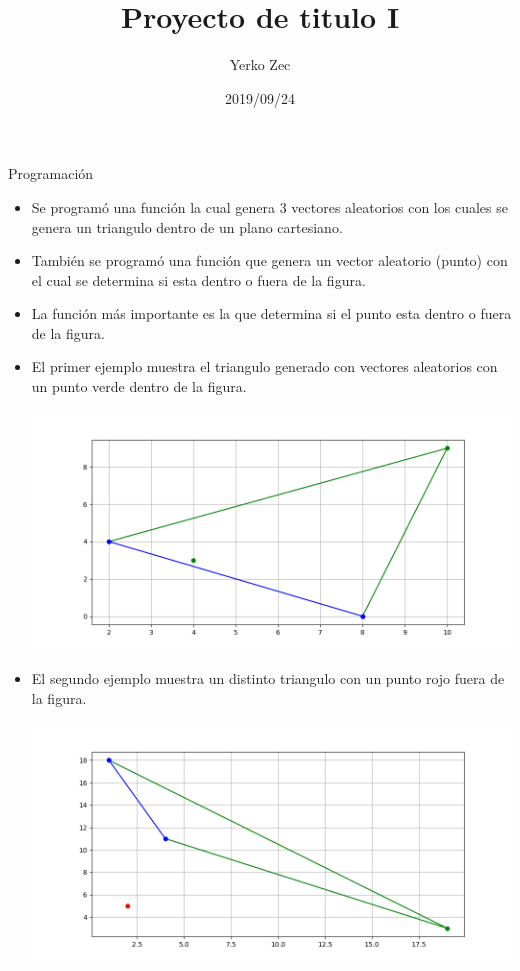 \documentclass{beamer}
\title{Proyecto de titulo I}
\author{Yerko Zec}
\institute[]{FI - UNAB}
\date{2019/09/24}
\begin{document}
\begin{frame}[plain]
  \titlepage
\end{frame}

\addtocounter{framenumber}{-1}

\begin{frame}{Programación}
\begin{itemize}
    \item Se programó una función la cual genera 3 vectores aleatorios con los cuales se genera un triangulo dentro de un plano cartesiano.
    \item También se programó una función que genera un vector aleatorio (punto) con el cual se determina si esta dentro o fuera de la figura.
    \item La función más importante es la que determina si el punto esta dentro o fuera de la figura.
\end{itemize}
\end{frame}

\begin{frame}
\begin{itemize}
    \item El primer ejemplo muestra el triangulo generado con vectores aleatorios con un punto verde dentro de la figura.
    
    \includegraphics[width=0.6\linewidth]{Figure_dentro}
    \item El segundo ejemplo muestra un distinto triangulo con un punto rojo fuera de la figura.
    
    \includegraphics[width=0.6\linewidth]{Figure_fuera}
\end{itemize}
\end{frame}
\end{document}
